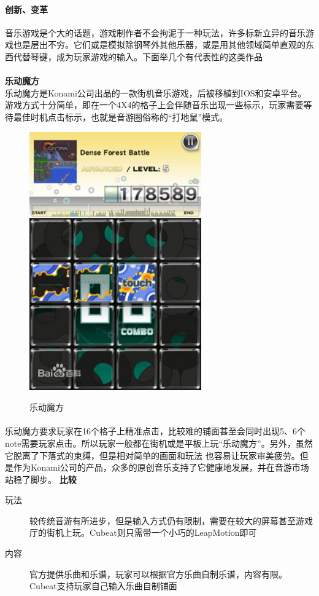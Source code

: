 \documentclass{article} \usepackage{CJK}
\begin{document}
\paragraph{创新、变革}
音乐游戏是个大的话题，游戏制作者不会拘泥于一种玩法，许多标新立异的音乐游戏也是层出不穷。它们或是模拟除钢琴外其他乐器，或是用其他领域简单直观的东西代替琴键，成为玩家游戏的输入。下面举几个有代表性的这类作品
\paragraph{}
\textbf{乐动魔方}\\
乐动魔方是Konami公司出品的一款街机音乐游戏，后被移植到IOS和安卓平台。游戏方式十分简单，即在一个4X4的格子上会伴随音乐出现一些标示，玩家需要等待最佳时机点击标示，也就是音游圈俗称的“打地鼠”模式。
\begin{figure}[H]
  \centering
  \includegraphics[width=20em]{gm1.png}\\
  \caption{乐动魔方}\label{3-3}
\end{figure}
\paragraph{}
乐动魔方要求玩家在16个格子上精准点击，比较难的铺面甚至会同时出现5、6个note需要玩家点击。所以玩家一般都在街机或是平板上玩“乐动魔方”。另外，虽然它脱离了下落式的束缚，但是相对简单的画面和玩法
也容易让玩家审美疲劳。但是作为Konami公司的产品，众多的原创音乐支持了它健康地发展，并在音游市场站稳了脚步。
\textbf{比较}
\begin{description}
  \item[玩法] 较传统音游有所进步，但是输入方式仍有限制，需要在较大的屏幕甚至游戏厅的街机上玩。Cubeat则只需带一个小巧的LeapMotion即可
  \item[内容] 官方提供乐曲和乐谱，玩家可以根据官方乐曲自制乐谱，内容有限。Cubeat支持玩家自己输入乐曲自制铺面
\end{description}
\newpage
\end{document}
